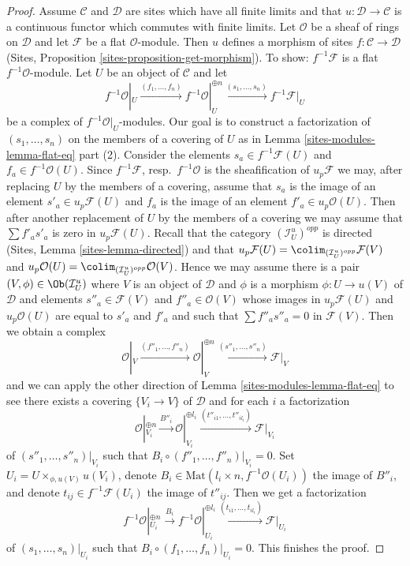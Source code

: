 \begin{proof}
\medskip\noindent
Assume $\mathcal{C}$ and $\mathcal{D}$ are sites which
have all finite limits and that $u : \mathcal{D} \to \mathcal{C}$
is a continuous functor which commutes with finite limits.
Let $\mathcal{O}$ be a sheaf of rings on $\mathcal{D}$
and let $\mathcal{F}$ be a flat $\mathcal{O}$-module.
Then $u$ defines a morphism of sites $f : \mathcal{C} \to \mathcal{D}$
(Sites, Proposition \ref{sites-proposition-get-morphism}).
To show: $f^{-1}\mathcal{F}$ is a flat $f^{-1}\mathcal{O}$-module.
Let $U$ be an object of $\mathcal{C}$ and let
$$
f^{-1}\mathcal{O}|_U \xrightarrow{(f_1, \ldots, f_n)}
f^{-1}\mathcal{O}|_U^{\oplus n} \xrightarrow{(s_1, \ldots, s_n)}
f^{-1}\mathcal{F}|_U
$$
be a complex of $f^{-1}\mathcal{O}|_U$-modules.
Our goal is to construct a factorization of
$(s_1, \ldots, s_n)$ on the members of a covering of $U$
as in Lemma \ref{sites-modules-lemma-flat-eq} part (2).
Consider the elements $s_a \in f^{-1}\mathcal{F}(U)$
and $f_a \in f^{-1}\mathcal{O}(U)$.
Since $f^{-1}\mathcal{F}$, resp.\ $f^{-1}\mathcal{O}$
is the sheafification of $u_p\mathcal{F}$ we may,
after replacing $U$ by the members of a covering,
assume that $s_a$ is the image of an element $s'_a \in u_p\mathcal{F}(U)$ and
$f_a$ is the image of an element $f'_a \in u_p\mathcal{O}(U)$.
Then after another replacement of $U$ by the members of a covering
we may assume that $\sum f'_as'_a$ is zero in $u_p\mathcal{F}(U)$.
Recall that the category $(\mathcal{I}_U^u)^{opp}$ is directed
(Sites, Lemma \ref{sites-lemma-directed})
and that $u_p\mathcal{F}(U) = \colim_{(\mathcal{I}_U^u)^{opp}} \mathcal{F}(V)$
and $u_p\mathcal{O}(U) = \colim_{(\mathcal{I}_U^u)^{opp}} \mathcal{O}(V)$.
Hence we may assume there is a pair $(V, \phi) \in \Ob(\mathcal{I}_U^u)$
where $V$ is an object of $\mathcal{D}$
and $\phi$ is a morphism $\phi : U \to u(V)$ of $\mathcal{D}$
and elements $s''_a \in \mathcal{F}(V)$ and $f''_a \in \mathcal{O}(V)$
whose images in $u_p\mathcal{F}(U)$ and $u_p\mathcal{O}(U)$
are equal to $s'_a$ and $f'_a$ and such that
$\sum f''_a s''_a = 0$ in $\mathcal{F}(V)$.
Then we obtain a complex
$$
\mathcal{O}|_V \xrightarrow{(f''_1, \ldots, f''_n)}
\mathcal{O}|_V^{\oplus n} \xrightarrow{(s''_1, \ldots, s''_n)}
\mathcal{F}|_V
$$
and we can apply the other direction of Lemma \ref{sites-modules-lemma-flat-eq}
to see there exists a covering $\{V_i \to V\}$ of $\mathcal{D}$
and for each $i$ a factorization
$$
\mathcal{O}|_{V_i}^{\oplus n}
\xrightarrow{B''_i}
\mathcal{O}|_{V_i}^{\oplus l_i} \xrightarrow{(t''_{i1}, \ldots, t''_{il_i})}
\mathcal{F}|_{V_i}
$$
of $(s''_1, \ldots, s''_n)|_{V_i}$ such that
$B_i \circ (f''_1, \ldots, f''_n)|_{V_i} = 0$.
Set $U_i = U \times_{\phi, u(V)} u(V_i)$, denote
$B_i \in \text{Mat}(l_i \times n, f^{-1}\mathcal{O}(U_i))$
the image of $B''_i$, and denote
$t_{ij} \in f^{-1}\mathcal{F}(U_i)$ the image of
$t''_{ij}$. Then we get a factorization
$$
f^{-1}\mathcal{O}|_{U_i}^{\oplus n}
\xrightarrow{B_i}
f^{-1}\mathcal{O}|_{U_i}^{\oplus l_i}
\xrightarrow{(t_{i1}, \ldots, t_{il_i})}
\mathcal{F}|_{U_i}
$$
of $(s_1, \ldots, s_n)|_{U_i}$ such that
$B_i \circ (f_1, \ldots, f_n)|_{U_i} = 0$.
This finishes the proof.
\end{proof}

